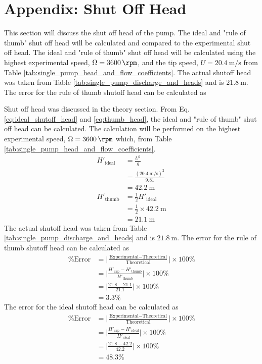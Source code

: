 \section{Appendix: Shut Off Head}
\label{sec:shut_off_head}
This section will discuss the shut off head of the pump. The ideal and "rule of thumb" shut off head will be calculated and compared to the experimental shut off head. The ideal and "rule of thumb" shut off head will be calculated using the highest experimental speed, $\Omega = \qty{3600}{\rpm}$, and the tip speed, $U = \qty{20.4}{\meter\per\second}$ from Table \ref{tab:single_pump_head_and_flow_coefficients}. The actual shutoff head was taken from Table \ref{tab:single_pump_discharge_and_heads} and is $\qty{21.8}{\meter}$. The error for the rule of thumb shutoff head can be calculated as

Shut off head was discussed in the theory section. From Eq. \ref{eq:ideal_shutoff_head} and \ref{eq:thumb_head}, the ideal and "rule of thumb" shut off head can be calculated. The calculation will be performed on the highest experimental speed, $\Omega = \qty{3600}{\rpm}$ which, from Table \ref{tab:single_pump_head_and_flow_coefficients}.
\begin{align*}
    H'_\text{ideal} &= \frac{U^2}{g} \\
    &= \frac{(\qty{20.4}{\meter\per\second})^2}{9.81} \\
    &= \qty{42.2}{\meter} \\
    H'_\text{thumb} &= \frac{1}{2} H'_\text{ideal} \\
    &= \frac{1}{2} \times \qty{42.2}{\meter} \\
    &= \qty{21.1}{\meter}
\end{align*}
The actual shutoff head was taken from Table \ref{tab:single_pump_discharge_and_heads} and is $\qty{21.8}{\meter}$. The error for the rule of thumb shutoff head can be calculated as
\begin{align*}
    \text{\% Error} &= \bigg|\frac{\text{Experimental} - \text{Theoretical}}{\text{Theoretical}}\bigg| \times 100\% \\
    &= \bigg|\frac{H'_\text{exp} - H'_\text{thumb}}{H'_\text{thumb}}\bigg| \times 100\% \\
    &= \bigg|\frac{21.8 - 21.1}{21.1}\bigg| \times 100\% \\
    &= 3.3\%
\end{align*}
The error for the ideal shutoff head can be calculated as
\begin{align*}
    \text{\% Error} &= \bigg|\frac{\text{Experimental} - \text{Theoretical}}{\text{Theoretical}}\bigg| \times 100\% \\
    &= \bigg|\frac{H'_\text{exp} - H'_\text{ideal}}{H'_\text{ideal}}\bigg| \times 100\% \\
    &= \bigg|\frac{21.8 - 42.2}{42.2}\bigg| \times 100\% \\
    &= 48.3\%
\end{align*}